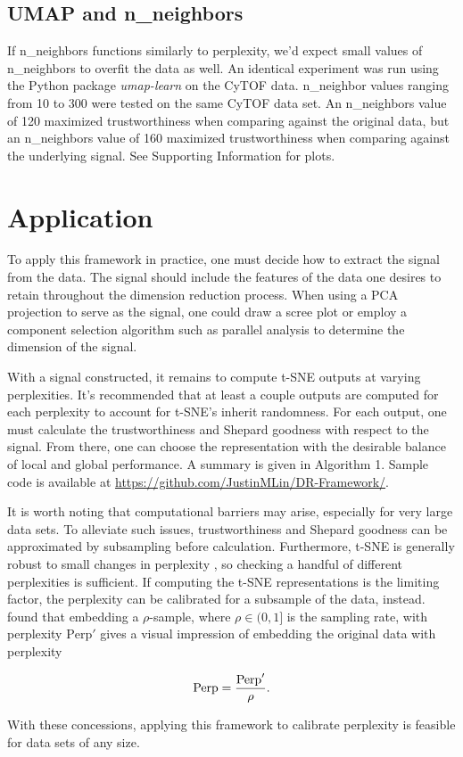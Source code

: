 \documentclass{article}
\begin{document}
\subsection{UMAP and n\_neighbors}
If n\_neighbors functions similarly to perplexity, we'd expect small values of n\_neighbors to overfit the data as well. An identical experiment was run using the Python package \textit{umap-learn} on the CyTOF data. n\_neighbor values ranging from 10 to 300 were tested on the same CyTOF data set. An n\_neighbors value of 120 maximized trustworthiness when comparing against the original data, but an n\_neighbors value of 160 maximized trustworthiness when comparing against the underlying signal. See Supporting Information for plots.

\section{Application}
To apply this framework in practice, one must decide how to extract the signal from the data. The signal should include the features of the data one desires to retain throughout the dimension reduction process. When using a PCA projection to serve as the signal, one could draw a scree plot or employ a component selection algorithm such as parallel analysis \cite{parallel analysis} to determine the dimension of the signal.

With a signal constructed, it remains to compute t-SNE outputs at varying perplexities. It's recommended that at least a couple outputs are computed for each perplexity to account for t-SNE's inherit randomness. For each output, one must calculate the trustworthiness and Shepard goodness with respect to the signal. From there, one can choose the representation with the desirable balance of local and global performance. A summary is given in Algorithm 1. Sample code is available at \url{https://github.com/JustinMLin/DR-Framework/}.

It is worth noting that computational barriers may arise, especially for very large data sets. To alleviate such issues, trustworthiness and Shepard goodness can be approximated by subsampling before calculation. Furthermore, t-SNE is generally robust to small changes in perplexity \cite{t-SNE}, so checking a handful of different perplexities is sufficient. If computing the t-SNE representations is the limiting factor, the perplexity can be calibrated for a subsample of the data, instead. \cite{subsample t-SNE} found that embedding a $\rho$-sample, where $\rho \in (0,1]$ is the sampling rate, with perplexity $\textrm{Perp}'$ gives a visual impression of embedding the original data with perplexity \begin{linenomath}$$\textrm{\textrm{Perp}} = \frac{\textrm{Perp}'}{\rho}.$$\end{linenomath} With these concessions, applying this framework to calibrate perplexity is feasible for data sets of any size.
\end{document}
